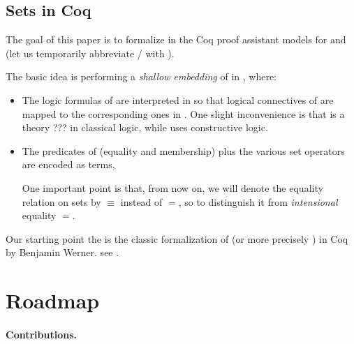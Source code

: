 \documentclass[sigplan,10pt,anonymous,review]{acmart}%
\begin{document}
\subsection{Sets in Coq}
The goal of this paper is to formalize in the Coq proof assistant models for \NFTWO{} and \NFO{} (let us temporarily abbreviate \NFTWO/\NFO{} with \NFX{}).

The basic idea is performing a \emph{shallow embedding} of \NFX{} in \Coq, where:

\begin{itemize}
  \item 
    The logic formulas of \NFX{} are interpreted in \Coq{} so that logical connectives of \NFX{} are mapped to the corresponding ones in \Coq{}. One slight inconvenience is that \NFX{} is a theory ??? in classical logic, while \Coq{} uses constructive logic. \TODO{}
  \item 
    The predicates of \NFX{} (equality and membership) plus the various set operators are encoded as \Coq{} terms, 

    One important point is that, from now on, we will denote the equality relation on \NFX{} sets by $\equiv$ instead of $=$, so to distinguish it from \Coq{} \emph{intensional} equality $=$.
\end{itemize}

Our starting point the is the classic formalization of \ZF{} (or more precisely \ZFC{} \TODO{}) in Coq by Benjamin Werner.  see .

\section{Roadmap}

\noindent
\paragraph{Contributions.}

\section{\ZF}
\label{sect:zf}


\section{\NFTWO}
\label{sect:nf2}


\section{\NFO}
\label{sect:nfo}

\end{document}
